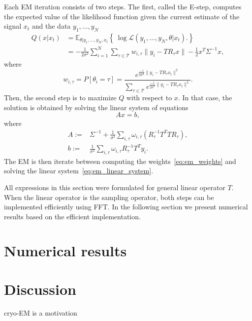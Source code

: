 \documentclass[english,12pt]{article}
\newcommand{\E}{\mathbb{E}}
\numberwithin{equation}{section}
\numberwithin{thm}{section} %
\begin{document}
Each EM iteration consists of two steps.
The first, called the E-step, computes the expected value of the likelihood function  given the current estimate of the signal $x_t$ and the data $y_1,\ldots,y_N$
\begin{equation}
\begin{split}
Q(x|x_t) &= \E_{\theta|y_1,\ldots,y_N,x_t}\left\{\ \log \mathcal{L}(y_1,\ldots,y_N,\theta|x_t).   \right\} \\
& = -\frac{1}{2\sigma^2}\sum_{i=1}^{N}\sum_{\tau\in\mathcal{T}}w_{i,\tau}\|y_i - TR_{\tau}x\| - \frac{1}{2}x^T\Sigma^{-1}x,
\end{split}
\end{equation} 
where 
\begin{equation} \label{eq:em_weights}
w_{i,\tau} = P[\theta_i = \tau] = \frac{e^{\frac{-1}{2\sigma^2}\|y_i-TR_\tau x_t\|^2 }}{\sum_{\tau\in\mathcal{T}}e^{\frac{-1}{2\sigma^2}\|y_i-TR_\tau x_t\|^2 }}.
\end{equation}
Then,  the second step is to maximize $Q$ with respect to $x$. In that case, the solution is obtained by solving the linear system of equations
\begin{equation} \label{eq:em_linear_system}
Ax = b,
\end{equation}
where 
\begin{align}
A :=&  \Sigma^{-1} + \frac{1}{\sigma^2}\sum_{i,\tau}\omega_{i,\tau} (R_\tau^{-1}T^TTR_\tau),\\ 
b :=&   \frac{1}{\sigma^2} \sum_{i,\tau}\omega_{i,\tau}R_\tau^{-1}T^Ty_i.
\end{align}
The EM is then iterate between computing the weights~\eqref{eq:em_weights} and solving the linear system~\eqref{eq:em_linear_system}. 

All expressions in this section were formulated for general linear operator $T$. When the linear operator is the sampling operator, both steps can be implemented efficiently using FFT. In the following section we present numerical results based on the efficient implementation. 

\section{Numerical results}


\section{Discussion} \label{sec:future_work}


cryo-EM is a motivation~\cite{chen2018single}
\end{document}
